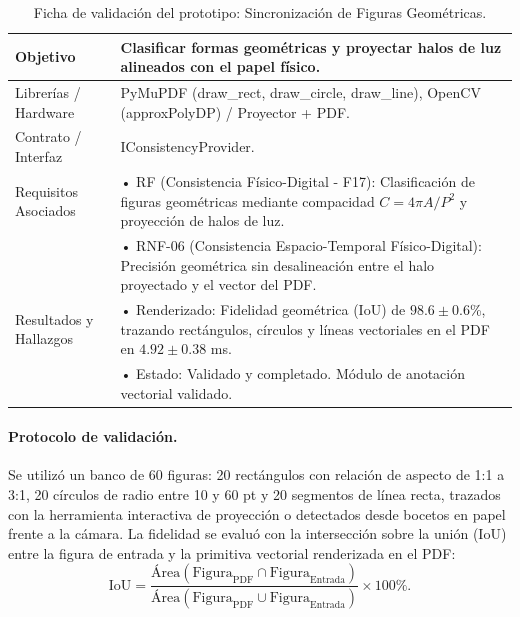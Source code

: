 \begin{table}[H]
    \centering
    \caption{Ficha de validación del prototipo: Sincronización de Figuras Geométricas.}
    \label{tab:ficha_f17}
    \begin{tabular}{L{3.2cm} L{11.0cm}}
        \toprule
        Objetivo & Clasificar formas geométricas y proyectar halos de luz alineados con el papel físico. \\ \midrule
        Librerías / Hardware & PyMuPDF (draw\_rect, draw\_circle, draw\_line), OpenCV (approxPolyDP) / Proyector + PDF. \\ \midrule
        Contrato / Interfaz & IConsistencyProvider. \\ \midrule
        Requisitos Asociados &
        • RF (Consistencia Físico-Digital - F17): Clasificación de figuras geométricas mediante compacidad $C = 4\pi A / P^{2}$ y proyección de halos de luz. \vspace{0.1cm} \\
        & • RNF-06 (Consistencia Espacio-Temporal Físico-Digital): Precisión geométrica sin desalineación entre el halo proyectado y el vector del PDF. \\ \midrule
        Resultados y Hallazgos &
        • Renderizado: Fidelidad geométrica (IoU) de $98.6 \pm 0.6$\%, trazando rectángulos, círculos y líneas vectoriales en el PDF en $4.92 \pm 0.38$ ms. \vspace{0.1cm} \\
        & • Estado: Validado y completado. Módulo de anotación vectorial validado. \\ \bottomrule
    \end{tabular}
\end{table}
 
\paragraph{Protocolo de validación.} Se utilizó un banco de 60 figuras: 20 rectángulos con relación de aspecto de 1:1 a 3:1, 20 círculos de radio entre 10 y 60 pt y 20 segmentos de línea recta, trazados con la herramienta interactiva de proyección o detectados desde bocetos en papel frente a la cámara. La fidelidad se evaluó con la intersección sobre la unión (IoU) entre la figura de entrada y la primitiva vectorial renderizada en el PDF:
\[ \mathrm{IoU} = \frac{\mathrm{Área}(\mathrm{Figura}_{\mathrm{PDF}} \cap \mathrm{Figura}_{\mathrm{Entrada}})}{\mathrm{Área}(\mathrm{Figura}_{\mathrm{PDF}} \cup \mathrm{Figura}_{\mathrm{Entrada}})} \times 100\%. \]
 
